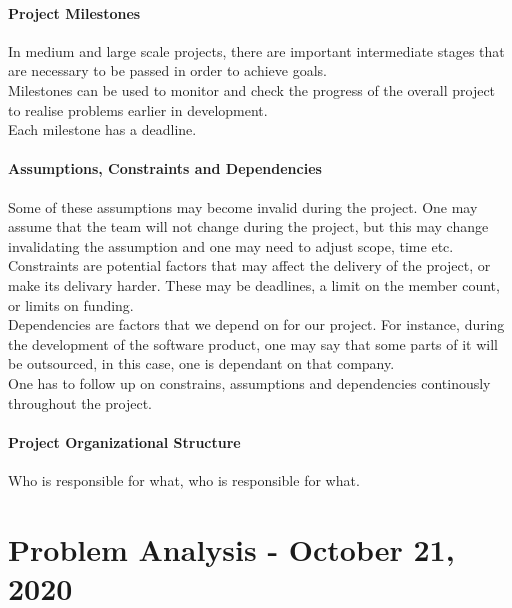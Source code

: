 \documentclass[11pt,a4paper,twocolumn]{book}
\begin{document}
\subsubsection{Project Milestones}

In medium and large scale projects, there are important intermediate stages that are necessary to be passed in order to achieve goals.\\

Milestones can be used to monitor and check the progress of the overall project to realise problems earlier in development.\\

Each milestone has a deadline.


\subsubsection{Assumptions, Constraints and Dependencies}

Some of these assumptions may become invalid during the project. One may assume that the team will not change during the project, but this may change invalidating the assumption and one may need to adjust scope, time etc.\\

Constraints are potential factors that may affect the delivery of the project, or make its delivary harder. These may be deadlines, a limit on the member count, or limits on funding.\\

Dependencies are factors that we depend on for our project. For instance, during the development of the software product, one may say that some parts of it will be outsourced, in this case, one is dependant on that company.\\

One has to follow up on constrains, assumptions and dependencies continously throughout the project.

\subsubsection{Project Organizational Structure}

Who is responsible for what, who is responsible for what.

\chapter{Problem Analysis - October 21, 2020}
\end{document}
